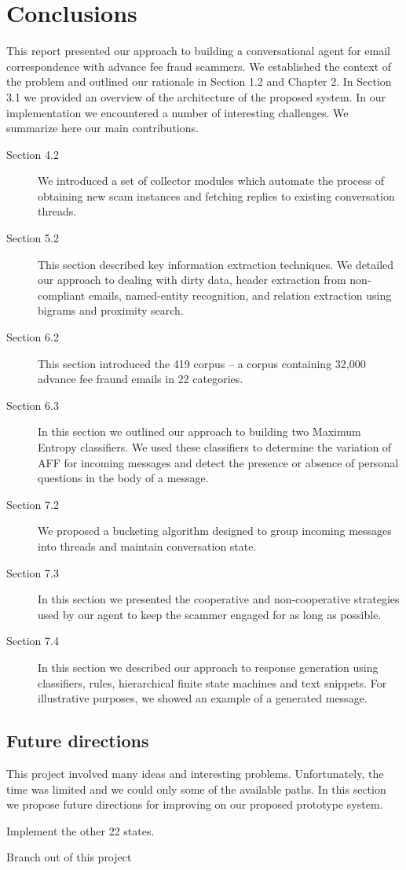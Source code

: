 \chapter{Conclusions}
This report presented our approach to building a conversational agent for email correspondence with advance fee fraud scammers.
We established the context of the problem and outlined our rationale in Section 1.2 and Chapter 2. In Section 3.1 we provided an
overview of the architecture of the proposed system. In our implementation we encountered a number of interesting challenges.
We summarize here our main contributions.
\begin{description}
\item[Section 4.2] We introduced a set of collector modules which automate the process of obtaining new scam instances and fetching replies to existing conversation threads.
\item[Section 5.2] This section described key information extraction techniques. We detailed our approach to dealing with dirty data, header extraction from non-compliant emails, named-entity recognition, and relation extraction using bigrams and proximity search.
\item[Section 6.2] This section introduced the 419 corpus -- a corpus containing 32,000 advance fee fraund emails in 22 categories.
\item[Section 6.3] In this section we outlined our approach to building two Maximum Entropy classifiers. We used these classifiers to determine the variation of AFF for incoming messages and detect the presence or absence of personal questions in the body of a message.
\item[Section 7.2] We proposed a bucketing algorithm designed to group incoming messages into threads and maintain conversation state.
\item[Section 7.3] In this section we presented the cooperative and non-cooperative strategies used by our agent to keep the scammer engaged for as long as possible.
\item[Section 7.4] In this section we described our approach to response generation using classifiers, rules, hierarchical finite state machines and text snippets. For illustrative purposes, we showed an example of a generated message.
\end{description}	

\section{Future directions}
This project involved many ideas and interesting problems. Unfortunately, the time was limited and we could only some of the available paths. In this section we propose future directions for improving on our proposed prototype system.

Implement the other 22 states.

Branch out of this project